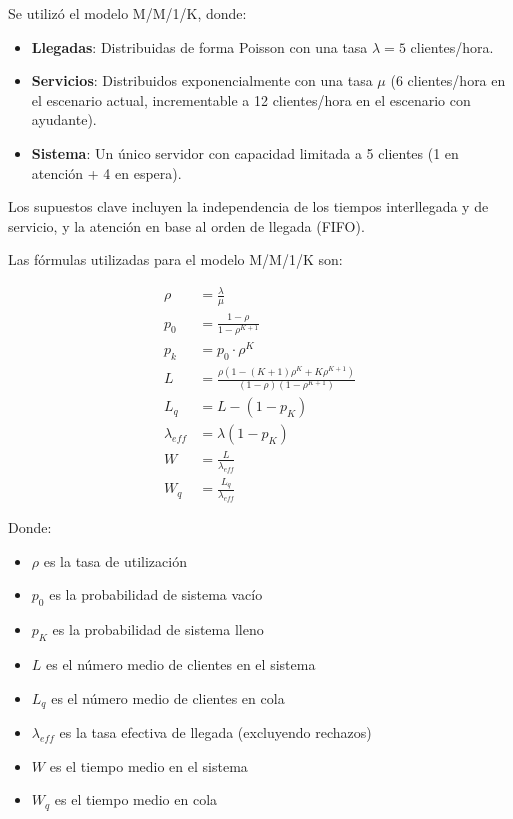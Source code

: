 \documentclass[12pt,a4paper]{article}
\begin{document}
Se utilizó el modelo M/M/1/K, donde:

\begin{itemize}
    \item \textbf{Llegadas}: Distribuidas de forma Poisson con una tasa $\lambda = 5$ clientes/hora.
    \item \textbf{Servicios}: Distribuidos exponencialmente con una tasa $\mu$ (6 clientes/hora en el escenario actual, incrementable a 12 clientes/hora en el escenario con ayudante).
    \item \textbf{Sistema}: Un único servidor con capacidad limitada a 5 clientes (1 en atención + 4 en espera).
\end{itemize}

Los supuestos clave incluyen la independencia de los tiempos interllegada y de servicio, y la atención en base al orden de llegada (FIFO).

Las fórmulas utilizadas para el modelo M/M/1/K son:

\begin{align}
\rho &= \frac{\lambda}{\mu} \\
p_0 &= \frac{1-\rho}{1-\rho^{K+1}} \\
p_k &= p_0 \cdot \rho^K \\
L &= \frac{\rho(1-(K+1)\rho^K + K\rho^{K+1})}{(1-\rho)(1-\rho^{K+1})} \\
L_q &= L - (1-p_K) \\
\lambda_{eff} &= \lambda(1-p_K) \\
W &= \frac{L}{\lambda_{eff}} \\
W_q &= \frac{L_q}{\lambda_{eff}}
\end{align}

Donde:
\begin{itemize}
    \item $\rho$ es la tasa de utilización
    \item $p_0$ es la probabilidad de sistema vacío
    \item $p_K$ es la probabilidad de sistema lleno
    \item $L$ es el número medio de clientes en el sistema
    \item $L_q$ es el número medio de clientes en cola
    \item $\lambda_{eff}$ es la tasa efectiva de llegada (excluyendo rechazos)
    \item $W$ es el tiempo medio en el sistema
    \item $W_q$ es el tiempo medio en cola
\end{itemize}
\end{document}
